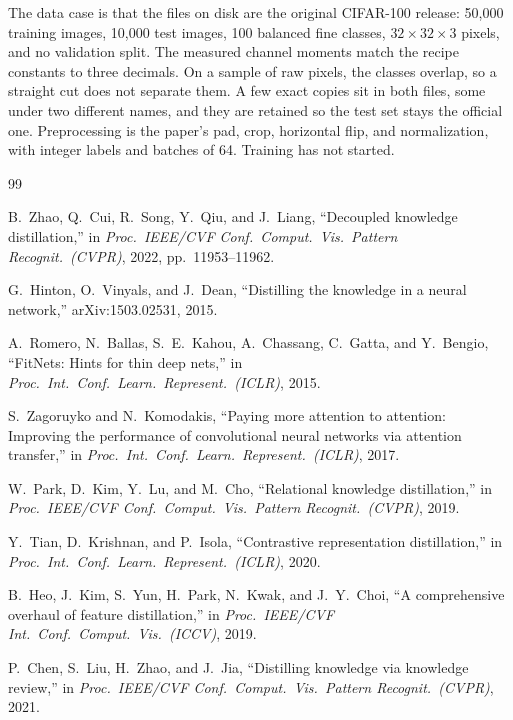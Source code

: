 \documentclass[11pt]{article}
\begin{document}
The data case is that the files on disk are the original CIFAR-100 release: 50{,}000 training images, 10{,}000 test images, 100 balanced fine classes, \(32 \times 32 \times 3\) pixels, and no validation split. The measured channel moments match the recipe constants to three decimals. On a sample of raw pixels, the classes overlap, so a straight cut does not separate them. A few exact copies sit in both files, some under two different names, and they are retained so the test set stays the official one. Preprocessing is the paper's pad, crop, horizontal flip, and normalization, with integer labels and batches of 64. Training has not started.

\clearpage
\begin{thebibliography}{99}

B.~Zhao, Q.~Cui, R.~Song, Y.~Qiu, and J.~Liang,
``Decoupled knowledge distillation,''
in \emph{Proc.\ IEEE/CVF Conf.\ Comput.\ Vis.\ Pattern Recognit.\ (CVPR)}, 2022, pp.\ 11953--11962.

G.~Hinton, O.~Vinyals, and J.~Dean,
``Distilling the knowledge in a neural network,''
arXiv:1503.02531, 2015.

A.~Romero, N.~Ballas, S.~E.~Kahou, A.~Chassang, C.~Gatta, and Y.~Bengio,
``FitNets: Hints for thin deep nets,''
in \emph{Proc.\ Int.\ Conf.\ Learn.\ Represent.\ (ICLR)}, 2015.

S.~Zagoruyko and N.~Komodakis,
``Paying more attention to attention: Improving the performance of convolutional neural networks via attention transfer,''
in \emph{Proc.\ Int.\ Conf.\ Learn.\ Represent.\ (ICLR)}, 2017.

W.~Park, D.~Kim, Y.~Lu, and M.~Cho,
``Relational knowledge distillation,''
in \emph{Proc.\ IEEE/CVF Conf.\ Comput.\ Vis.\ Pattern Recognit.\ (CVPR)}, 2019.

Y.~Tian, D.~Krishnan, and P.~Isola,
``Contrastive representation distillation,''
in \emph{Proc.\ Int.\ Conf.\ Learn.\ Represent.\ (ICLR)}, 2020.

B.~Heo, J.~Kim, S.~Yun, H.~Park, N.~Kwak, and J.~Y.~Choi,
``A comprehensive overhaul of feature distillation,''
in \emph{Proc.\ IEEE/CVF Int.\ Conf.\ Comput.\ Vis.\ (ICCV)}, 2019.

P.~Chen, S.~Liu, H.~Zhao, and J.~Jia,
``Distilling knowledge via knowledge review,''
in \emph{Proc.\ IEEE/CVF Conf.\ Comput.\ Vis.\ Pattern Recognit.\ (CVPR)}, 2021.


\end{thebibliography}
\end{document}
